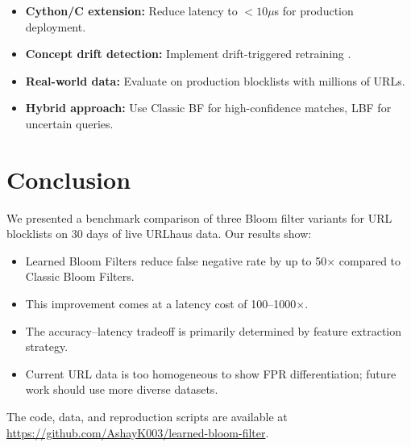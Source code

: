 \documentclass[11pt,a4paper]{article}
\begin{document}
\begin{itemize}
    \item \textbf{Cython/C extension:} Reduce latency to $<10\mu$s for production deployment.
    \item \textbf{Concept drift detection:} Implement drift-triggered retraining \cite{baumel2021}.
    \item \textbf{Real-world data:} Evaluate on production blocklists with millions of URLs.
    \item \textbf{Hybrid approach:} Use Classic BF for high-confidence matches, LBF for uncertain queries.
\end{itemize}

\section{Conclusion}

We presented a benchmark comparison of three Bloom filter variants for URL blocklists on 30 days of live URLhaus data. Our results show:

\begin{itemize}
    \item Learned Bloom Filters reduce false negative rate by up to 50$\times$ compared to Classic Bloom Filters.
    \item This improvement comes at a latency cost of 100--1000$\times$.
    \item The accuracy--latency tradeoff is primarily determined by feature extraction strategy.
    \item Current URL data is too homogeneous to show FPR differentiation; future work should use more diverse datasets.
\end{itemize}

The code, data, and reproduction scripts are available at \url{https://github.com/AshayK003/learned-bloom-filter}.
\end{document}
